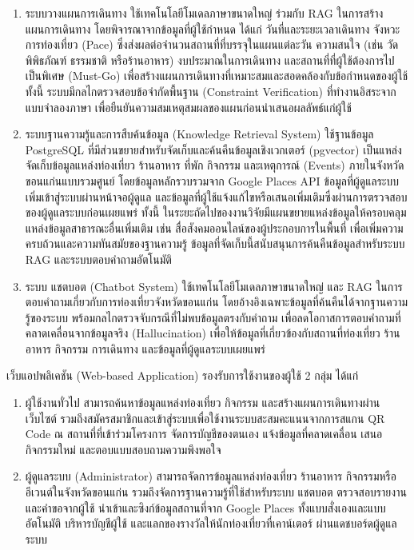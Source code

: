 \begin{enumerate}
\item ระบบวางแผนการเดินทาง ใช้เทคโนโลยีโมเดลภาษาขนาดใหญ่ ร่วมกับ RAG ในการสร้างแผนการเดินทาง โดยพิจารณาจากข้อมูลที่ผู้ใช้กำหนด ได้แก่ วันที่และระยะเวลาเดินทาง จังหวะการท่องเที่ยว (Pace) ซึ่งส่งผลต่อจำนวนสถานที่ที่บรรจุในแผนแต่ละวัน ความสนใจ (เช่น วัด พิพิธภัณฑ์ ธรรมชาติ หรือร้านอาหาร) งบประมาณในการเดินทาง และสถานที่ที่ผู้ใช้ต้องการไปเป็นพิเศษ (Must-Go) เพื่อสร้างแผนการเดินทางที่เหมาะสมและสอดคล้องกับข้อกำหนดของผู้ใช้ ทั้งนี้ ระบบมีกลไกตรวจสอบข้อจำกัดพื้นฐาน (Constraint Verification) ที่ทำงานอิสระจากแบบจำลองภาษา เพื่อยืนยันความสมเหตุสมผลของแผนก่อนนำเสนอผลลัพธ์แก่ผู้ใช้
\item ระบบฐานความรู้และการสืบค้นข้อมูล (Knowledge Retrieval System) ใช้ฐานข้อมูล PostgreSQL ที่มีส่วนขยายสำหรับจัดเก็บและค้นคืนข้อมูลเชิงเวกเตอร์ (pgvector) เป็นแหล่งจัดเก็บข้อมูลแหล่งท่องเที่ยว ร้านอาหาร ที่พัก กิจกรรม และเหตุการณ์ (Events) ภายในจังหวัดขอนแก่นแบบรวมศูนย์ โดยข้อมูลหลักรวบรวมจาก Google Places API ข้อมูลที่ผู้ดูแลระบบเพิ่มเข้าสู่ระบบผ่านหน้าจอผู้ดูแล และข้อมูลที่ผู้ใช้แจ้งแก้ไขหรือเสนอเพิ่มเติมซึ่งผ่านการตรวจสอบของผู้ดูแลระบบก่อนเผยแพร่ ทั้งนี้ ในระยะถัดไปของงานวิจัยมีแผนขยายแหล่งข้อมูลให้ครอบคลุมแหล่งข้อมูลสาธารณะอื่นเพิ่มเติม เช่น สื่อสังคมออนไลน์ของผู้ประกอบการในพื้นที่ เพื่อเพิ่มความครบถ้วนและความทันสมัยของฐานความรู้ ข้อมูลที่จัดเก็บนี้สนับสนุนการค้นคืนข้อมูลสำหรับระบบ RAG และระบบตอบคำถามอัตโนมัติ
\item ระบบ แชตบอต (Chatbot System) ใช้เทคโนโลยีโมเดลภาษาขนาดใหญ่ และ RAG ในการตอบคำถามเกี่ยวกับการท่องเที่ยวจังหวัดขอนแก่น โดยอ้างอิงเฉพาะข้อมูลที่ค้นคืนได้จากฐานความรู้ของระบบ พร้อมกลไกตรวจจับกรณีที่ไม่พบข้อมูลตรงกับคำถาม เพื่อลดโอกาสการตอบคำถามที่คลาดเคลื่อนจากข้อมูลจริง (Hallucination) เพื่อให้ข้อมูลที่เกี่ยวข้องกับสถานที่ท่องเที่ยว ร้านอาหาร กิจกรรม การเดินทาง และข้อมูลที่ผู้ดูแลระบบเผยแพร่
\end{enumerate}

เว็บแอปพลิเคชัน (Web-based Application) รองรับการใช้งานของผู้ใช้ 2 กลุ่ม ได้แก่

\begin{enumerate}
\item ผู้ใช้งานทั่วไป สามารถค้นหาข้อมูลแหล่งท่องเที่ยว กิจกรรม และสร้างแผนการเดินทางผ่านเว็บไซต์ รวมถึงสมัครสมาชิกและเข้าสู่ระบบเพื่อใช้งานระบบสะสมคะแนนจากการสแกน QR Code ณ สถานที่ที่เข้าร่วมโครงการ จัดการบัญชีของตนเอง แจ้งข้อมูลที่คลาดเคลื่อน เสนอกิจกรรมใหม่ และตอบแบบสอบถามความพึงพอใจ
\item ผู้ดูแลระบบ (Administrator) สามารถจัดการข้อมูลแหล่งท่องเที่ยว ร้านอาหาร กิจกรรมหรืออีเวนต์ในจังหวัดขอนแก่น รวมถึงจัดการฐานความรู้ที่ใช้สำหรับระบบ แชตบอต ตรวจสอบรายงานและคำขอจากผู้ใช้ นำเข้าและซิงก์ข้อมูลสถานที่จาก Google Places ทั้งแบบสั่งเองและแบบอัตโนมัติ บริหารบัญชีผู้ใช้ และแลกของรางวัลให้นักท่องเที่ยวที่เคาน์เตอร์ ผ่านแดชบอร์ดผู้ดูแลระบบ
\end{enumerate}

